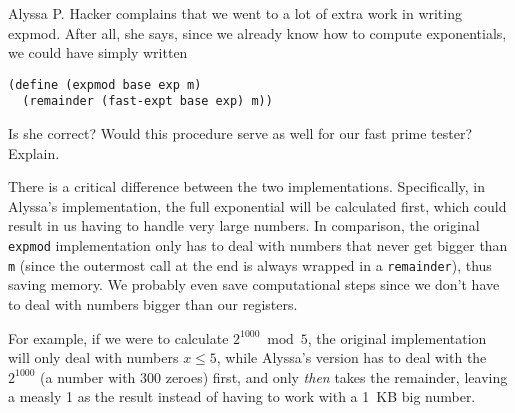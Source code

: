 \documentclass{sicp}
\date{August 26, 2024}
\begin{document}
\maketitle

\begin{displayquote}
	Alyssa P. Hacker complains that we went to a lot of extra work in writing expmod. After all, she says, since we already know how to compute exponentials, we could have simply written
	\begin{lstlisting}
(define (expmod base exp m)
  (remainder (fast-expt base exp) m))
\end{lstlisting}
	Is she correct? Would this procedure serve as well for our fast prime tester? Explain.
\end{displayquote}

There is a critical difference between the two implementations.
Specifically, in Alyssa's implementation, the full exponential will be calculated first, which could result in us having to handle very large numbers.
In comparison, the original \texttt{expmod} implementation only has to deal with numbers that never get bigger than \texttt{m} (since the outermost call at the end is always wrapped in a \texttt{remainder}), thus saving memory.
We probably even save computational steps since we don't have to deal with numbers bigger than our registers.

For example, if we were to calculate $2^{1000} \bmod 5$, the original implementation will only deal with numbers $x \leq 5$, while Alyssa's version has to deal with the $2^{1000}$ (a number with 300 zeroes) first, and only \emph{then} takes the remainder, leaving a measly 1 as the result instead of having to work with a 1~KB big number.
\end{document}
